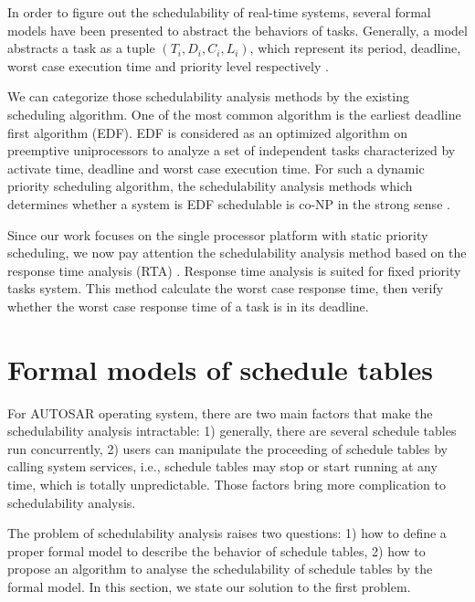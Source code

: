\documentclass[sigconf]{acmart}
\begin{document}
In order to figure out the schedulability of real-time systems, several formal models have been presented to abstract the behaviors of tasks. Generally, a model abstracts a task as a tuple $(T_i,D_i,C_i,L_i)$, which represent its period, deadline, worst case execution time and priority level respectively \cite{DBLP:journals/csur/BurnsD17}. 

We can categorize those schedulability analysis methods by the existing scheduling algorithm. One of the most common algorithm is the earliest deadline first algorithm (EDF). EDF is considered as an optimized algorithm on preemptive uniprocessors to analyze a set of independent tasks characterized by activate time, deadline and worst case execution time. For such a dynamic priority scheduling algorithm, the schedulability analysis methods which determines whether a system is EDF schedulable is co-NP in the strong sense \cite{Goossens:1999:LWC:553897}.

Since our work focuses on the single processor platform with static priority scheduling, we now pay attention the schedulability analysis method based on the response time analysis (RTA) \cite{DBLP:journals/iee/AudsleyBRTW93}. Response time analysis is suited for fixed priority tasks system. This method calculate the worst case response time, then verify whether the worst case response time of a task is in its deadline. 

\section{Formal models of schedule tables} 
For AUTOSAR operating system, there are two main factors that make the schedulability analysis intractable: 1) generally, there are several schedule tables run concurrently, 2) users can manipulate the proceeding of schedule tables by calling system services, i.e., schedule tables may stop or start running at any time, which is totally unpredictable. Those factors bring more complication to schedulability analysis. 

The problem of schedulability analysis raises two questions: 1) how to define a proper formal model to describe the behavior of schedule tables, 2) how to propose an algorithm to analyse the schedulability of schedule tables by the formal model. In this section, we state our solution to the first problem. 
\end{document}
